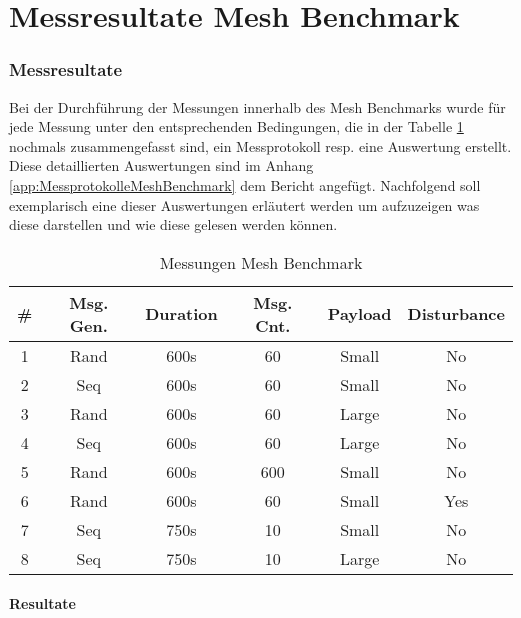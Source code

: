 \vspace*{4cm}
\part{Messresultate Mesh Benchmark}\label{part:MessresultateMeshBenchmark}
\vspace*{\fill}
\clearpage

\section{Messresultate}\label{sec:Messresultate}
Bei der Durchführung der Messungen innerhalb des Mesh Benchmarks wurde für jede Messung unter den entsprechenden Bedingungen, die in der Tabelle \ref{tab:MessungenMeshBenchmark} nochmals zusammengefasst sind, ein Messprotokoll resp. eine Auswertung erstellt. Diese detaillierten Auswertungen sind im Anhang \ref{app:MessprotokolleMeshBenchmark} dem Bericht angefügt.
Nachfolgend soll exemplarisch eine dieser Auswertungen erläutert werden um aufzuzeigen was diese darstellen und wie diese gelesen werden können.

\begin{table}[h]
\centering
\begin{tabular}{|c|c|c|c|c|c|} 
\hline
\textbf{\#}  & \textbf{Msg. Gen.}  & \textbf{Duration}  & \textbf{Msg. Cnt.}  & \textbf{Payload }  & \textbf{Disturbance}  \\ 
\hline
1 & Rand & 600s & 60 & Small & No \\ 
\hline
2 & Seq & 600s & 60 & Small & No \\ 
\hline
3 & Rand & 600s & 60 & Large & No \\ 
\hline
4 & Seq & 600s & 60 & Large & No \\ 
\hline
5 & Rand & 600s & 600 & Small & No \\ 
\hline
6 & Rand & 600s & 60 & Small & Yes \\ 
\hline
7 & Seq & 750s & 10 & Small & No \\ 
\hline
8 & Seq & 750s & 10 & Large & No \\
\hline
\end{tabular}
\caption{Messungen Mesh Benchmark}
\label{tab:MessungenMeshBenchmark}
\end{table}


\subsection{Resultate}\label{subsec:Resultate}


